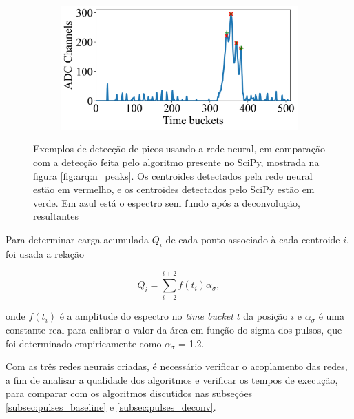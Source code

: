 \documentclass[a4paper,12pt,oneside]{book}
\begin{document}
\begin{figure}[H]
\begin{subfigure}[b]{0.49\textwidth}
        \caption{}
        \label{subfig:exs_n_peaks_3}
    \end{subfigure}%
    \hfill
    \begin{subfigure}[b]{0.465\textwidth}
        \centering
        \includegraphics[scale=0.425]{figs/np_exs4.png}
        \caption{}
        \label{subfig:exs_n_peaks_4}
    \end{subfigure}
\caption{Exemplos de detecção de picos usando a rede neural, em comparação com a detecção feita pelo algoritmo presente no SciPy, mostrada na figura \ref{fig:arq:n_peaks}. Os centroides detectados pela rede neural estão em vermelho, e os centroides detectados pelo SciPy estão em verde. Em azul está o espectro sem fundo após a deconvolução, resultantes }
\label{fig:exs_n_peaks}
\end{figure}

\par Para determinar carga acumulada $Q_i$ de cada ponto associado à cada centroide $i$, foi usada a relação

\begin{equation}\label{eq:carga_acumulada_ml}
	Q_i = \sum_{i - 2}^{i + 2}f(t_i)\alpha_\sigma,
\end{equation}

\par onde $f(t_i)$ é a amplitude do espectro no \textit{time bucket} $t$ da posição $i$ e $\alpha_\sigma$ é uma constante real para calibrar o valor da área em função do sigma dos pulsos, que foi determinado empiricamente como $\alpha_\sigma$ = 1.2.

\par Com as três redes neurais criadas, é necessário verificar o acoplamento das redes, a fim de analisar a qualidade dos algoritmos e verificar os tempos de execução, para comparar com os algoritmos discutidos nas subseções \ref{subsec:pulses_baseline} e \ref{subsec:pulses_deconv}.
\end{document}
